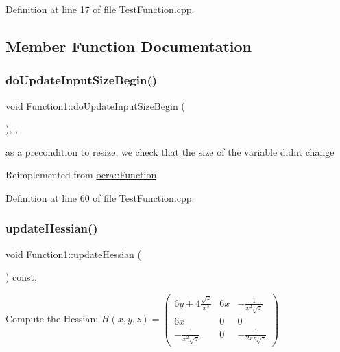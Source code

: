 Definition at line 17 of file Test\+Function.\+cpp.



\subsection{Member Function Documentation}
\hypertarget{classFunction1_aec0bc51f050a1bd32cece26e524e5c97}{}\label{classFunction1_aec0bc51f050a1bd32cece26e524e5c97} 
\subsubsection{\texorpdfstring{do\+Update\+Input\+Size\+Begin()}{doUpdateInputSizeBegin()}}
{\footnotesize\ttfamily void Function1\+::do\+Update\+Input\+Size\+Begin (\begin{DoxyParamCaption}{ }\end{DoxyParamCaption})\hspace{0.3cm}{\ttfamily [inline]}, {\ttfamily [protected]}, {\ttfamily [virtual]}}

as a precondition to resize, we check that the size of the variable didn\textquotesingle{}t change 

Reimplemented from \hyperlink{classocra_1_1Function_a3f728f3758e6448aa59932853db5ddcc}{ocra\+::\+Function}.



Definition at line 60 of file Test\+Function.\+cpp.

\hypertarget{classFunction1_a1d88a2ebb5ad3cb35f7d40ab002b71f0}{}\label{classFunction1_a1d88a2ebb5ad3cb35f7d40ab002b71f0} 
\subsubsection{\texorpdfstring{update\+Hessian()}{updateHessian()}}
{\footnotesize\ttfamily void Function1\+::update\+Hessian (\begin{DoxyParamCaption}{ }\end{DoxyParamCaption}) const\hspace{0.3cm}{\ttfamily [inline]}, {\ttfamily [protected]}}

Compute the Hessian\+: $ H(x,y,z) = \left(\begin{array}{lcr} 6y + 4\frac{\sqrt{z}}{x^3} & 6x & -\frac{1}{x^2 \sqrt{z}} \\ 6x & 0 & 0 \\ -\frac{1}{x^2 \sqrt{z}} & 0 & -\frac{1}{2xz \sqrt{z}} \end{array}\right) $ 

